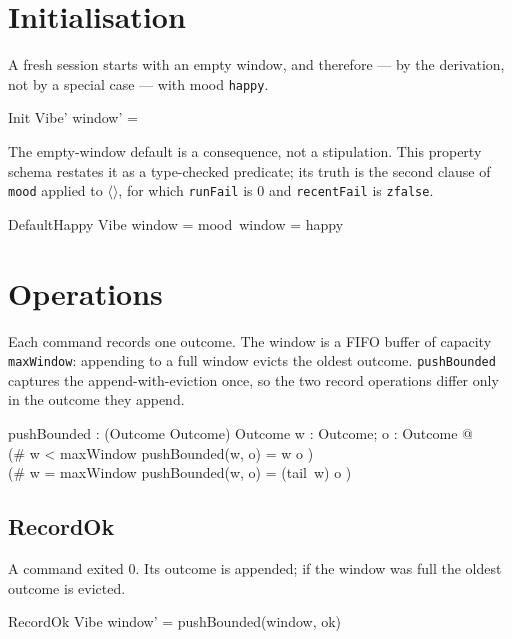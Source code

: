 \documentclass[a4paper,10pt,fleqn]{article}
\begin{document}
\section{Initialisation}

A fresh session starts with an empty window, and therefore --- by the derivation,
not by a special case --- with mood \texttt{happy}.

\begin{schema}{Init}
  Vibe'
\where
  window' = \langle \rangle
\end{schema}

The empty-window default is a consequence, not a stipulation. This property
schema restates it as a type-checked predicate; its truth is the second clause of
\texttt{mood} applied to $\langle\rangle$, for which \texttt{runFail} is $0$ and
\texttt{recentFail} is \texttt{zfalse}.

\begin{schema}{DefaultHappy}
  Vibe
\where
  window = \langle \rangle \implies mood~window = happy
\end{schema}

\section{Operations}

Each command records one outcome. The window is a FIFO buffer of capacity
\texttt{maxWindow}: appending to a full window evicts the oldest outcome.
\texttt{pushBounded} captures the append-with-eviction once, so the two record
operations differ only in the outcome they append.

\begin{axdef}
  pushBounded : (\seq Outcome \cross Outcome) \fun \seq Outcome
\where
  \forall w : \seq Outcome; o : Outcome @ \\
  \quad (\# w < maxWindow \implies pushBounded(w, o) = w \cat \langle o \rangle) \land \\
  \quad (\# w = maxWindow \implies pushBounded(w, o) = (tail~w) \cat \langle o \rangle)
\end{axdef}

\subsection{RecordOk}

A command exited $0$. Its outcome is appended; if the window was full the oldest
outcome is evicted.

\begin{schema}{RecordOk}
  \Delta Vibe
\where
  window' = pushBounded(window, ok)
\end{schema}
\end{document}
